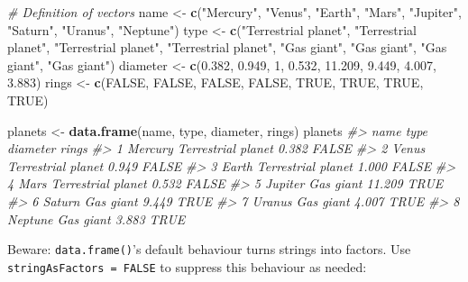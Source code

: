 \documentclass[]{book}
\newenvironment{Shaded}{\begin{snugshade}}{\end{snugshade}}
\newcommand{\CommentTok}[1]{\textcolor[rgb]{0.56,0.35,0.01}{\textit{#1}}}
\newcommand{\DecValTok}[1]{\textcolor[rgb]{0.00,0.00,0.81}{#1}}
\newcommand{\FloatTok}[1]{\textcolor[rgb]{0.00,0.00,0.81}{#1}}
\newcommand{\KeywordTok}[1]{\textcolor[rgb]{0.13,0.29,0.53}{\textbf{#1}}}
\newcommand{\NormalTok}[1]{#1}
\newcommand{\OtherTok}[1]{\textcolor[rgb]{0.56,0.35,0.01}{#1}}
\newcommand{\StringTok}[1]{\textcolor[rgb]{0.31,0.60,0.02}{#1}}
\begin{document}
\begin{Shaded}
\begin{Highlighting}[]
\CommentTok{# Definition of vectors}
\NormalTok{name <-}\StringTok{ }\KeywordTok{c}\NormalTok{(}\StringTok{"Mercury"}\NormalTok{, }\StringTok{"Venus"}\NormalTok{, }\StringTok{"Earth"}\NormalTok{, }\StringTok{"Mars"}\NormalTok{, }\StringTok{"Jupiter"}\NormalTok{, }\StringTok{"Saturn"}\NormalTok{, }\StringTok{"Uranus"}\NormalTok{, }\StringTok{"Neptune"}\NormalTok{)}
\NormalTok{type <-}\StringTok{ }\KeywordTok{c}\NormalTok{(}\StringTok{"Terrestrial planet"}\NormalTok{, }\StringTok{"Terrestrial planet"}\NormalTok{, }\StringTok{"Terrestrial planet"}\NormalTok{, }\StringTok{"Terrestrial planet"}\NormalTok{, }\StringTok{"Gas giant"}\NormalTok{, }\StringTok{"Gas giant"}\NormalTok{, }\StringTok{"Gas giant"}\NormalTok{, }\StringTok{"Gas giant"}\NormalTok{)}
\NormalTok{diameter <-}\StringTok{ }\KeywordTok{c}\NormalTok{(}\FloatTok{0.382}\NormalTok{, }\FloatTok{0.949}\NormalTok{, }\DecValTok{1}\NormalTok{, }\FloatTok{0.532}\NormalTok{, }\FloatTok{11.209}\NormalTok{, }\FloatTok{9.449}\NormalTok{, }\FloatTok{4.007}\NormalTok{, }\FloatTok{3.883}\NormalTok{)}
\NormalTok{rings <-}\StringTok{ }\KeywordTok{c}\NormalTok{(}\OtherTok{FALSE}\NormalTok{, }\OtherTok{FALSE}\NormalTok{, }\OtherTok{FALSE}\NormalTok{, }\OtherTok{FALSE}\NormalTok{, }\OtherTok{TRUE}\NormalTok{, }\OtherTok{TRUE}\NormalTok{, }\OtherTok{TRUE}\NormalTok{, }\OtherTok{TRUE}\NormalTok{)}

\NormalTok{planets <-}\StringTok{ }\KeywordTok{data.frame}\NormalTok{(name, type, diameter, rings)}
\NormalTok{planets}
\CommentTok{#>      name               type diameter rings}
\CommentTok{#> 1 Mercury Terrestrial planet    0.382 FALSE}
\CommentTok{#> 2   Venus Terrestrial planet    0.949 FALSE}
\CommentTok{#> 3   Earth Terrestrial planet    1.000 FALSE}
\CommentTok{#> 4    Mars Terrestrial planet    0.532 FALSE}
\CommentTok{#> 5 Jupiter          Gas giant   11.209  TRUE}
\CommentTok{#> 6  Saturn          Gas giant    9.449  TRUE}
\CommentTok{#> 7  Uranus          Gas giant    4.007  TRUE}
\CommentTok{#> 8 Neptune          Gas giant    3.883  TRUE}
\end{Highlighting}
\end{Shaded}

Beware: \texttt{data.frame()}'s default behaviour turns strings into factors. Use \texttt{stringAsFactors\ =\ FALSE} to suppress this behaviour as needed:
\end{document}

